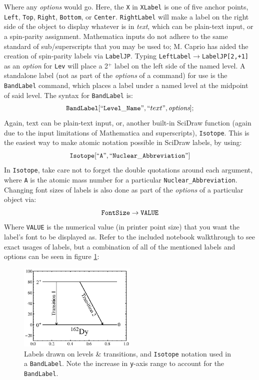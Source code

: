 \documentclass[portrait,10pt]{article}
\begin{document}
Where any \textit{options} would go. Here, the {\tt X} in {\tt XLabel} is one of five anchor points, {\tt Left}, {\tt Top}, {\tt Right}, {\tt Bottom}, or {\tt Center}. {\tt RightLabel} will make a label on the right side of the object to display whatever is in \textit{text}, which can be plain-text input, or a spin-parity assignment. Mathematica inputs do not adhere to the same standard of sub/superscripts that you may be used to; M. Caprio has aided the creation of spin-parity labels via {\tt LabelJP}. Typing {\tt LeftLabel$\rightarrow$LabelJP[2,+1]} as an \textit{option} for {\tt Lev} will place a 2$^+$ label on the left side of the named level. A standalone label (not as part of the \textit{options} of a command) for use is the {\tt BandLabel} command, which places a label under a named level at the midpoint of said level. The syntax for {\tt BandLabel} is:
\begin{equation} \label{eq:BandLabel}
{\tt BandLabel[}``{\tt Level\_Name}",``text",\textit{options}];
\end{equation}
Again, text can be plain-text input, or, another built-in SciDraw function (again due to the input limitations of Mathematica and superscripts), {\tt Isotope}. This is the easiest way to make atomic notation possible in SciDraw labels, by using:
\begin{equation}\label{eq:Isotope}
{\tt Isotope[}``{\tt A}", ``{\tt Nuclear\_Abbreviation}"]
\end{equation}
In {\tt Isotope}, take care not to forget the double quotations around each argument, where {\tt A} is the atomic mass number for a particular {\tt Nuclear\_Abbreviation}. Changing font sizes of labels is also done as part of the \textit{options} of a particular object via:
\begin{equation}\label{eq:FontSize}
{\tt FontSize\rightarrow VALUE}
\end{equation}
Where {\tt VALUE} is the numerical value (in printer point size) that you want the label's font to be displayed as. Refer to the included notebook walkthrough to see exact usages of labels, but a combination of all of the mentioned labels and options can be seen in figure \ref{text:Labels}:
\begin{figure}[h]
\begin{center}
\includegraphics[width=0.5\textwidth]{Labels.eps}
\caption{Labels drawn on levels \& transitions, and {\tt Isotope} notation used in a {\tt BandLabel}. Note the increase in {\tt y}-axis range to account for the {\tt BandLabel}. \label{text:Labels}}
\end{center}
\end{figure}
\end{document}
